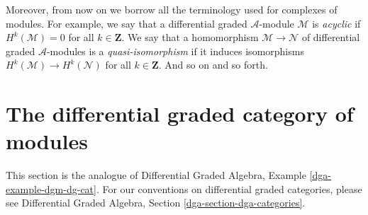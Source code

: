 \medskip\noindent
Moreover, from now on we borrow all the terminology used for
complexes of modules. For example, we say that a differential
graded $\mathcal{A}$-module $\mathcal{M}$ is {\it acyclic} if
$H^k(\mathcal{M}) = 0$ for all $k \in \mathbf{Z}$. We say that a
homomorphism $\mathcal{M} \to \mathcal{N}$
of differential graded $\mathcal{A}$-modules is a {\it quasi-isomorphism}
if it induces isomorphisms $H^k(\mathcal{M}) \to H^k(\mathcal{N})$
for all $k \in \mathbf{Z}$. And so on and so forth.

\section{The differential graded category of modules}
\label{sdga-section-dgm-dg-cat}
This section is the analogue of
Differential Graded Algebra, Example \ref{dga-example-dgm-dg-cat}.
For our conventions on differential graded categories, please
see Differential Graded Algebra, Section \ref{dga-section-dga-categories}.

